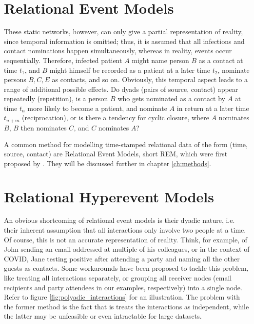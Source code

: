 \section{Relational Event Models}
\label{sec:rem}

These static networks, however, can only give a partial representation of reality, since temporal information is omitted; thus, it is assumed that all infections and contact nominations happen simultaneously, whereas in reality, events occur sequentially. Therefore, infected patient $A$ might name person $B$ as a contact at time $t_1$, and $B$ might himself be recorded as a patient at a later time $t_2$, nominate persons $B,C,E$ as contacts, and so on. Obviously, this temporal aspect leads to a range of additional possible effects. Do dyads (pairs of source, contact) appear repeatedly (repetition), is a person $B$ who gets nominated as a contact by $A$ at time $t_n$ more likely to become a patient, and nominate $A$ in return at a later time $t_{n+m}$ (reciprocation), or is there a tendency for cyclic closure, where $A$ nominates $B$, $B$ then nominates $C$, and $C$ nominates $A$? 

A common method for modelling time-stamped relational data of the form (time, source, contact) are Relational Event Models, short REM, which were first proposed by . They will be discussed further in chapter \ref{ch:methods}.

\section{Relational Hyperevent Models}
\label{sec:rhem}

An obvious shortcoming of relational event models is their dyadic nature, i.e. their inherent assumption that all interactions only involve two people at a time. Of course, this is not an accurate representation of reality. Think, for example, of John sending an email addressed at multiple of his colleagues, or in the context of COVID, Jane testing positive after attending a party and naming all the other guests as contacts. Some workarounds have been proposed to tackle this problem, like treating all interactions separately, or grouping all receiver nodes (email recipients and party attendees in our examples, respectively) into a single node. Refer to figure \ref{fig:polyadic_interactions} for an illustration. The problem with the former method is the fact that is treats the interactions as independent, while the latter may be unfeasible or even intractable for large datasets.

